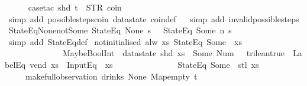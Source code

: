 \begin{isabellebody}
\ \ \ \ \isamarkupfalse%
\ {\isacharparenleft}case{\isacharunderscore}tac\ {\isachardoublequoteopen}shd\ t\ {\isacharequal}\ {\isacharparenleft}STR\ {\isacharprime}{\isacharprime}coin{\isacharprime}{\isacharprime}{\isacharcomma}\ {\isacharbrackleft}{\isacharbrackright}{\isacharparenright}{\isachardoublequoteclose}{\isacharparenright}\isanewline
\ \ \ \isamarkupfalse%
\ {\isacharparenleft}simp\ add{\isacharcolon}\ possible{\isacharunderscore}steps{\isacharunderscore}coin\ datastate\ coin{\isacharunderscore}def{\isacharparenright}\isanewline
\ \ \isamarkupfalse%
{\isacharparenleft}simp\ add{\isacharcolon}\ invalid{\isacharunderscore}possible{\isacharunderscore}steps{\isacharunderscore}{}{\isacharparenright}%
\endisatagproof
{\isafoldproof}%
%
\isadelimproof
\isanewline
%
\endisadelimproof
\isanewline
{}\isamarkupfalse%
\ StateEq{\isacharunderscore}None{\isacharunderscore}not{\isacharunderscore}Some{\isacharcolon}\ {\isachardoublequoteopen}StateEq\ None\ s\ {\isasymLongrightarrow}\ {\isasymnot}\ StateEq\ {\isacharparenleft}Some\ n{\isacharparenright}\ s{\isachardoublequoteclose}\isanewline
%
\isadelimproof
\ \ %
\endisadelimproof
%
\isatagproof
{}\isamarkupfalse%
\ {\isacharparenleft}simp\ add{\isacharcolon}\ StateEq{\isacharunderscore}def{\isacharparenright}%
\endisatagproof
{\isafoldproof}%
%
\isadelimproof
\isanewline
%
\endisadelimproof
\isanewline
{}\isamarkupfalse%
\ not{\isacharunderscore}initialised{\isacharcolon}\ {\isachardoublequoteopen}alw\ {\isacharparenleft}{\isasymlambda}xs{\isachardot}\ StateEq\ {\isacharparenleft}Some\ {}{\isacharparenright}\ xs\ {\isasymand}\isanewline
\ \ \ \ \ \ \ \ \ \ \ \ \ \ MaybeBoolInt\ {\isacharparenleft}{\isacharless}{\isacharparenright}\ {\isacharparenleft}datastate\ {\isacharparenleft}shd\ xs{\isacharparenright}\ {\isacharparenleft}{}{\isacharparenright}{\isacharparenright}\ {\isacharparenleft}Some\ {\isacharparenleft}Num\ {}{\isacharparenright}{\isacharparenright}\ {\isacharequal}\ trilean{\isachardot}true\ {\isasymand}\ LabelEq\ {\isacharprime}{\isacharprime}vend{\isacharprime}{\isacharprime}\ xs\ {\isasymand}\ InputEq\ {\isacharbrackleft}{\isacharbrackright}\ xs\ {\isasymlongrightarrow}\isanewline
\ \ \ \ \ \ \ \ \ \ \ \ \ \ StateEq\ {\isacharparenleft}Some\ {}{\isacharparenright}\ {\isacharparenleft}stl\ xs{\isacharparenright}{\isacharparenright}\isanewline
\ \ \ \ \ {\isacharparenleft}make{\isacharunderscore}full{\isacharunderscore}observation\ drinks\ None\ Map{\isachardot}empty\ t{\isacharparenright}{\isachardoublequoteclose}\isanewline

\end{isabellebody}
